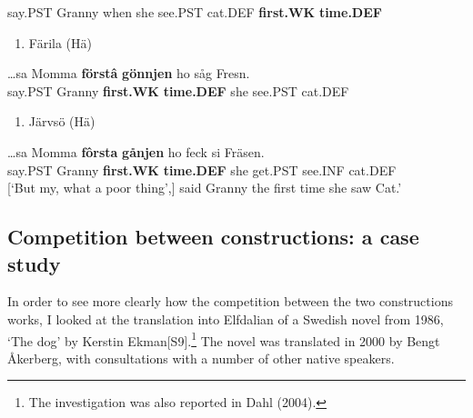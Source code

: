 say.PST  Granny  when  she  see.PST  cat.DEF  \textbf{first.WK} \textbf{time.DEF}\\ %


\begin{enumerate} %
\item 
Färila (Hä)

\end{enumerate} %
\ea\label{}
\gll …sa  Momma  \textbf{förstâ} \textbf{gönnjen} ho  såg  Fresn.\\


say.PST  Granny  \textbf{first.WK} \textbf{time.DEF} she  see.PST  cat.DEF\\ %


\begin{enumerate} %
\item 
Järvsö (Hä)

\end{enumerate} %
\ea\label{}
\gll …sa  Momma  \textbf{fôrsta}\textbf{  gånjen} ho  feck  si  Fräsen.\\


say.PST  Granny  \textbf{first.WK} \textbf{time.DEF} she  get.PST  see.INF  cat.DEF\\ %


[‘But my, what a poor thing’,] said Granny the first time she saw Cat.’
\z


\subsection[Competition between constructions: a case study]{\rmfamily Competition between constructions: a case study}
In order to see more clearly how the competition between the two constructions works, I looked at the translation into Elfdalian of a Swedish novel from 1986,  ‘The dog’ by Kerstin Ekman[S9].\footnote{ The investigation was also reported in Dahl (2004).} The novel was translated in 2000 by Bengt Åkerberg, with consultations with a number of other native speakers. 

